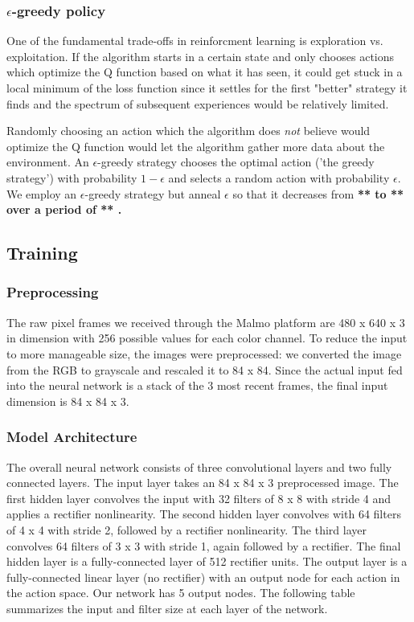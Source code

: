 \documentclass{article}
\begin{document}
\begin{multicols}{2}
\subsubsection{$\epsilon$-greedy policy}

One of the fundamental trade-offs in reinforcment learning is exploration vs. exploitation. If the algorithm starts in a certain state and only chooses actions which optimize the Q function based on what it has seen, it could get stuck in a local minimum of the loss function since it settles for the first "better" strategy it finds and the spectrum of subsequent experiences would be relatively limited.

Randomly choosing an action which the algorithm does \emph{not} believe would optimize the Q function would let the algorithm gather more data about the environment. An $\epsilon$-greedy strategy chooses the optimal action ('the greedy strategy') with probability $1-\epsilon$ and selects a random action with probability $\epsilon$.
We employ an $\epsilon$-greedy strategy but anneal $\epsilon$ so that it decreases from \bf *** \rm to \bf *** \rm over a period of \bf *** \rm.


\subsection{Training}

\subsubsection{Preprocessing}

The raw pixel frames we received through the Malmo platform are 480 x 640 x 3 in dimension with 256 possible values for each color channel. To reduce the input to more manageable size, the images were preprocessed: we converted the image from the RGB to grayscale and rescaled it to 84 x 84. Since the actual input fed into the neural network is a stack of the 3 most recent frames, the final input dimension is 84 x 84 x 3.

\subsubsection{Model Architecture}

The overall neural network consists of three convolutional layers and two fully connected layers. The input layer takes an 84 x 84 x 3 preprocessed image. The first hidden layer convolves the input with 32 filters of 8 x 8 with stride 4 and applies a rectifier nonlinearity. The second hidden layer convolves with 64 filters of 4 x 4 with stride 2, followed by a rectifier nonlinearity. The third layer convolves 64 filters of 3 x 3 with stride 1, again followed by a rectifier. The final hidden layer is a fully-connected layer of 512 rectifier units. The output layer is a fully-connected linear layer (no rectifier) with an output node for each action in the action space. Our network has 5 output nodes. The following table summarizes the input and filter size at each layer of the network.
\newline


\end{multicols}
\end{document}
